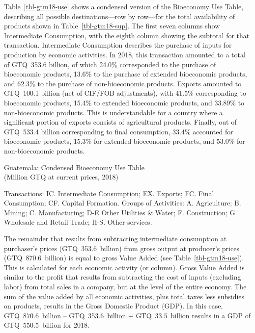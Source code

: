 \documentclass[
  letterpaper,
  DIV=11,
  numbers=noendperiod]{scrartcl}
\begin{document}
Table~\ref{tbl-gtm18-use} shows a condensed version of the Bioeconomy
Use Table, describing all possible destinations---row by row---for the
total availability of products shown in Table~\ref{tbl-gtm18-sup}. The
first seven columns show Intermediate Consumption, with the eighth
column showing the subtotal for that transaction. Intermediate
Consumption describes the purchase of inputs for production by economic
activities. In 2018, this transaction amounted to a total of GTQ~353.6
billion, of which 24.0\% corresponded to the purchase of bioeconomic
products, 13.6\% to the purchase of extended bioeconomic products, and
62.3\% to the purchase of non-bioeconomic products. Exports amounted to
GTQ~100.1 billion (net of CIF/FOB adjustments), with 41.5\%
corresponding to bioeconomic products, 15.4\% to extended bioeconomic
products, and 33.89\% to non-bioeconomic products. This is
understandable for a country where a significant portion of exports
consists of agricultural products. Finally, out of GTQ~533.4 billion
corresponding to final consumption, 33.4\% accounted for bioeconomic
products, 15.3\% for extended bioeconomic products, and 53.0\% for
non-bioeconomic products.

\begin{table}

\caption{\label{tbl-gtm18-use}Guatemala: Condensed Bioeconomy Use
Table\\
(Million GTQ at current prices, 2018)}


\end{table}%

Transactions: IC. Intermediate Consumption; EX. Exports; FC. Final
Consumption; CF. Capital Formation. Groups of Activities: A.
Agriculture; B. Mining; C. Manufacturing; D-E Other Utilities \& Water;
F. Construction; G. Wholesale and Retail Trade; H-S. Other services.

The remainder that results from subtracting intermediate consumption at
purchaser's prices (GTQ~353.6~billion) from gross output at producer's
prices (GTQ~870.6~billion) is equal to gross Value Added (see
Table~\ref{tbl-gtm18-use}). This is calculated for each economic
activity (or column). Gross Value Added is similar to the profit that
results from subtracting the cost of inputs (excluding labor) from total
sales in a company, but at the level of the entire economy. The sum of
the value added by all economic activities, plus total taxes less
subsidies on products, results in the Gross Domestic Product (GDP). In
this case, GTQ~870.6~billion -- GTQ~353.6~billion + GTQ~33.5~billion
results in a GDP of GTQ~550.5~billion for 2018.
\end{document}
